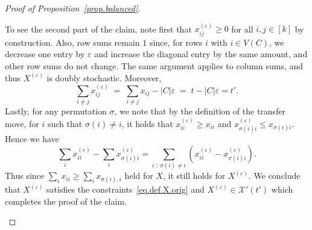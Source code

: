 \documentclass[a4paper,UKenglish,cleveref, autoref, thm-restate,numberwithinsect]{lipics-v2021}
\newcommand{\cX}{\mathcal{X}}
\newcommand{\eps}{\varepsilon}
\newcommand{\Fc}{
}
\begin{document}
\begin{proof}[Proof of Proposition~\ref{prop.balanced}]
\begin{claimproof}
To see the second part of the claim, note first that $x^{(\varepsilon)}_{ij}\ge 0$ for all $i,j\in [k]$ by construction.
Also, row sums remain $1$ since, for rows $i$ with $i\in V(C)$, we decrease one entry by $\eps$ and increase the diagonal
entry by the same amount, and other row sums do not change. The same argument applies to column sums, 
and thus $X^{(\varepsilon)}$ is doubly stochastic. Moreover, 
\[
\sum_{i\neq j} x^{(\varepsilon)}_{ij} \;=\; \sum_{i\neq j} x_{ij} - |C|\varepsilon \;=\; t-|C|\varepsilon=t'.
\]
%
Lastly, for any permutation $\sigma$, {\Fc we note that by the definition of the transfer move, for $i$ such that $\sigma(i)\neq i$, it holds that $x_{ii}^{(\eps)}\geq x_{ii}$ and $x^{(\eps)}_{\sigma(i)i}\leq x_{\sigma(i)i}$. Hence we have
\[\sum_i x^{(\eps)}_{ii}-\sum_{i}x^{(\eps)}_{\sigma(i)i} = \sum_{i \; : \; \sigma(i)\neq i} ( x_{ii}^{(\eps)} - x^{(\eps)}_{\sigma(i)i} ).\]
%
%
 }
%
Thus since $\sum_i x_{ii}\ge \sum_i x_{\sigma(i),i}$ held for $X$, it still holds for $X^{(\varepsilon)}$. We conclude that $X^{(\eps)}$ satisfies the constraints~\eqref{eq.def.X.orig} and $X^{(\eps)}\in \cX'(t')$ which completes the proof of the claim.
\end{claimproof}


\end{proof}
\end{document}
